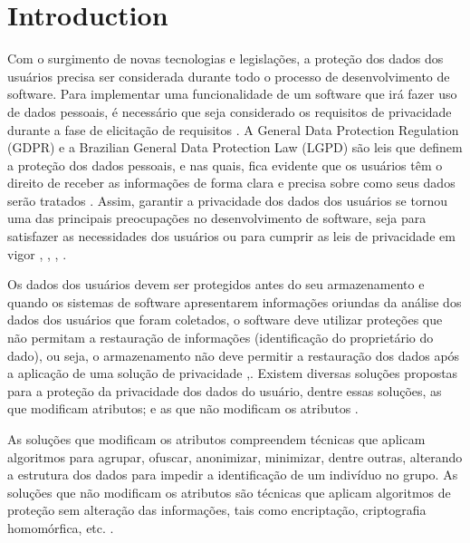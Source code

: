 \documentclass[conference]{IEEEtran}
\begin{document}
\section{Introduction}

Com o surgimento de novas tecnologias e legislações, a proteção dos dados dos usuários precisa ser considerada durante todo o processo de desenvolvimento de software. Para implementar uma funcionalidade de um software que irá fazer uso de dados pessoais, é necessário que seja considerado os requisitos de privacidade durante a fase de elicitação de requisitos \cite{DBLP:conf/wer/NettoPS19}. A General Data Protection Regulation (GDPR) \cite{Eu2019} e a Brazilian General Data Protection Law (LGPD) \cite{leiLGPD} são leis que definem a proteção dos dados pessoais, e nas quais, fica evidente que os usuários têm o direito de receber as informações de forma clara e precisa sobre como seus dados serão tratados \cite{DBLP:conf/re/Ayala-RiveraP18}. Assim, garantir a privacidade dos dados dos usuários se tornou uma das principais preocupações no desenvolvimento de software, seja para satisfazer as necessidades dos usuários ou para cumprir as leis de privacidade em vigor \cite{DBLP:conf/sbes/PeixotoS18}, \cite{DBLP:conf/wer/NettoPS19}, \cite{DBLP:conf/amcis/HuthM19}, \cite{DBLP:conf/IEEEares/HorakSH19}.

Os dados dos usuários devem ser protegidos antes do seu armazenamento e quando os sistemas de software apresentarem informações oriundas da análise dos dados dos usuários que foram coletados, o software deve utilizar proteções que não permitam a restauração de informações (identificação do proprietário do dado), ou seja, o armazenamento não deve permitir a restauração dos dados após a aplicação de uma solução de privacidade \cite{Eu2019},\cite{leiLGPD}. Existem diversas soluções propostas para a proteção da privacidade dos dados do usuário, dentre essas soluções, as que modificam atributos; e as que não modificam os atributos \cite{DBLP:journals/iotj/Vergara-Laurens17}.

As soluções que modificam os atributos compreendem técnicas que aplicam algoritmos para agrupar, ofuscar, anonimizar, minimizar, dentre outras, alterando a estrutura dos dados para impedir a identificação de um indivíduo no grupo. As soluções que não modificam os atributos são técnicas que aplicam algoritmos de proteção sem alteração das informações, tais como encriptação, criptografia homomórfica, etc. \cite{DBLP:journals/iotj/Vergara-Laurens17}.
\end{document}

